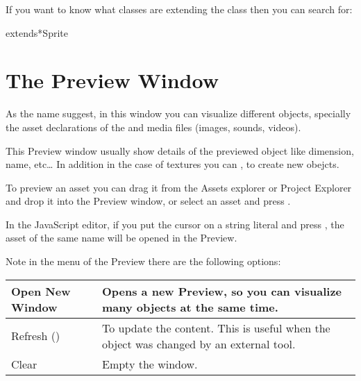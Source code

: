 \documentclass[letterpaper,10pt,english]{sphinxmanual}
\begin{document}
\noindent{}

If you want to know what classes are extending the  class then you can search for:

\begin{sphinxVerbatim}[commandchars=\\\{\}]
extends*Sprite
\end{sphinxVerbatim}

\noindent{}


\chapter{The Preview Window}
\label{\detokenize{preview_window:the-preview-window}}\label{\detokenize{preview_window::doc}}
As the name suggest, in this window you can visualize different objects, specially the asset declarations of the  and media files (images, sounds, videos).

This Preview window usually show details of the previewed object like dimension, name, etc… In addition in the case of textures you can , to create new obejcts.

To preview an asset you can drag it from the Assets explorer or Project Explorer and drop it into the Preview window, or select an asset and press .

In the JavaScript editor, if you put the cursor on a string literal and press , the asset of the same name will be opened in the Preview.

\noindent{}

Note in the menu of the Preview there are the following options:

\noindent{}


\begin{savenotes}\sphinxattablestart
\centering
\begin{tabulary}{\linewidth}[t]{|T|T|}
\hline

Open New Window
&
Opens a new Preview, so you can visualize many objects at the same time.
\\
\hline
Refresh ()
&
To update the content. This is useful when the object was changed by an external tool.
\\
\hline
Clear
&
Empty the window.
\\
\hline
\end{tabulary}
\par
\sphinxattableend\end{savenotes}
\end{document}
